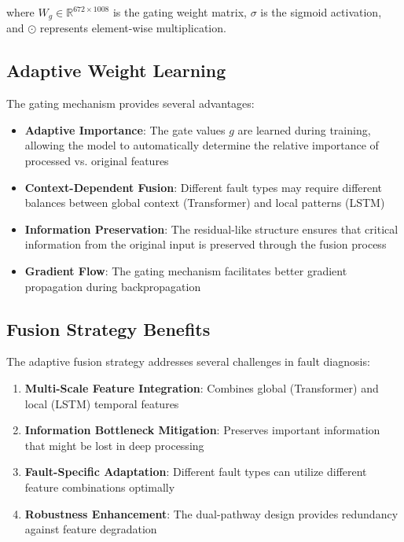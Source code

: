 where $W_g \in \mathbb{R}^{672 \times 1008}$ is the gating weight matrix, $\sigma$ is the sigmoid activation, and $\odot$ represents element-wise multiplication.

\subsection{Adaptive Weight Learning}
\label{subsec:adaptive_weights}

The gating mechanism provides several advantages:

\begin{itemize}
    \item \textbf{Adaptive Importance}: The gate values $g$ are learned during training, allowing the model to automatically determine the relative importance of processed vs. original features
    \item \textbf{Context-Dependent Fusion}: Different fault types may require different balances between global context (Transformer) and local patterns (LSTM)
    \item \textbf{Information Preservation}: The residual-like structure ensures that critical information from the original input is preserved through the fusion process
    \item \textbf{Gradient Flow}: The gating mechanism facilitates better gradient propagation during backpropagation
\end{itemize}

\subsection{Fusion Strategy Benefits}
\label{subsec:fusion_benefits}

The adaptive fusion strategy addresses several challenges in fault diagnosis:

\begin{enumerate}
    \item \textbf{Multi-Scale Feature Integration}: Combines global (Transformer) and local (LSTM) temporal features
    \item \textbf{Information Bottleneck Mitigation}: Preserves important information that might be lost in deep processing
    \item \textbf{Fault-Specific Adaptation}: Different fault types can utilize different feature combinations optimally
    \item \textbf{Robustness Enhancement}: The dual-pathway design provides redundancy against feature degradation
\end{enumerate}

